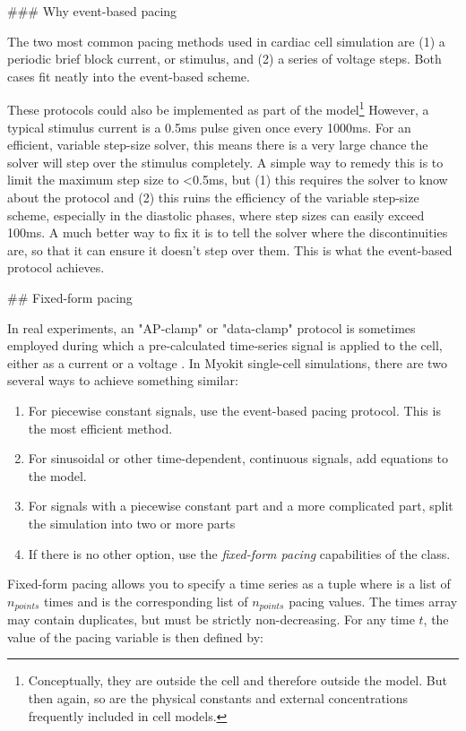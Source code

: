 ### Why event-based pacing

The two most common pacing methods used in cardiac cell simulation are (1) a
 periodic brief block current, or stimulus, and (2) a series of voltage steps.
Both cases fit neatly into the event-based scheme.

These protocols could also be implemented as part of the model\footnote{
 Conceptually, they are outside the cell and therefore outside the model.
 But then again, so are the physical constants and external concentrations
  frequently included in cell models.
  }
However, a typical stimulus current is a 0.5ms pulse given once every 1000ms.
For an efficient, variable step-size solver, this means there is a very large
 chance the solver will step over the stimulus completely.
A simple way to remedy this is to limit the maximum step size to <0.5ms, but
 (1) this requires the solver to know about the protocol and (2) this ruins the
 efficiency of the variable step-size scheme, especially in the diastolic
 phases, where step sizes can easily exceed 100ms.
A much better way to fix it is to tell the solver where the discontinuities
 are, so that it can ensure it doesn't step over them.
This is what the event-based protocol achieves.

## Fixed-form pacing

In real experiments, an "AP-clamp" or "data-clamp" protocol is sometimes
 employed during which a pre-calculated time-series signal is applied to the
 cell, either as a current or a voltage \citep{Bebarova2012PatchClamp}.
In Myokit single-cell simulations, there are two several ways to achieve
 something similar:

\begin{enumerate}
\item For piecewise constant signals, use the event-based pacing protocol. This
 is the most efficient method.
\item For sinusoidal or other time-dependent, continuous signals, add equations
 to the model.
\item For signals with a piecewise constant part and a more complicated part,
 split the simulation into two or more parts
\item If there is no other option, use the \emph{fixed-form pacing}
 capabilities of the  class.
 \end{enumerate}

Fixed-form pacing allows you to specify a time series as a tuple
  where  is a list of $n_{points}$ times and
  is the corresponding list of $n_{points}$ pacing values.
The times array may contain duplicates, but must be strictly non-decreasing.
For any time $t$, the value of the pacing variable is then defined by:

